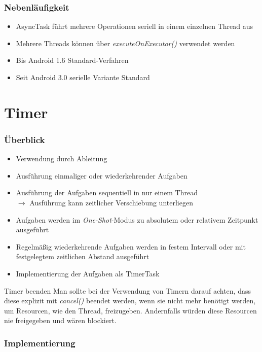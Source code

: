 \begin{frame}
   \frametitle{Nebenläufigkeit}
   \begin{itemize}
		\item AsyncTask führt mehrere Operationen seriell in einem einzelnen Thread aus
		\item Mehrere Threads können über \emph{executeOnExecutor()} verwendet werden
		\item Bis Android 1.6 Standard-Verfahren
		\item Seit Android 3.0 serielle Variante Standard
   \end{itemize}
\end{frame}

\section{Timer}
\begin{frame}
   \frametitle{Überblick}
   \begin{itemize}
     	\item Verwendung durch Ableitung
     	\item Ausführung einmaliger oder wiederkehrender Aufgaben
     	\item Ausführung der Aufgaben sequentiell in nur einem Thread\\
     		$\rightarrow$ Ausführung kann zeitlicher Verschiebung unterliegen
     	\item Aufgaben werden im \emph{One-Shot}-Modus zu absolutem 
     		oder relativem Zeitpunkt ausgeführt
     	\item Regelmäßig wiederkehrende Aufgaben werden in festem Intervall oder 
     		mit festgelegtem zeitlichen Abstand ausgeführt
     	\item Implementierung der Aufgaben als TimerTask
   \end{itemize}
   
   \begin{alertblock}{Timer beenden}
   	Man sollte bei der Verwendung von Timern darauf achten, dass diese 
		explizit mit \emph{cancel()} beendet werden, wenn sie nicht mehr benötigt werden, 
		um Resourcen, wie den Thread, freizugeben. Andernfalls würden diese Resourcen 
		nie freigegeben und wären blockiert.
   \end{alertblock}
\end{frame}

\begin{frame}
   \frametitle{Implementierung}
	
\end{frame}

